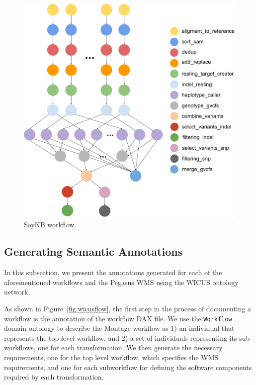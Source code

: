 \begin{figure}[!htb]
	\centering
	\includegraphics[width=0.95\linewidth]{figures/workflow-soybean}
	\caption{SoyKB workflow.}
	\label{fig:workflow-soykb}
\end{figure}



\subsection{Generating Semantic Annotations}

In this subsection, we present the annotations generated for each of the aforementioned
workflows and the Pegasus WMS using the WICUS ontology network.


As shown in Figure~\ref{fig:wicusflow}, the first step in the process of documenting a workflow is the annotation of the workflow DAX file. We use the \texttt{Workflow} domain ontology to describe the Montage workflow as 1) an individual that represents the top level workflow, and 2) a set of individuals representing its sub-workflows, one for each transformation. We then generate the necessary requirements, one for the top level workflow, which specifies the WMS requirements, and one for each subworkflow for defining the software components required by each transformation. 

